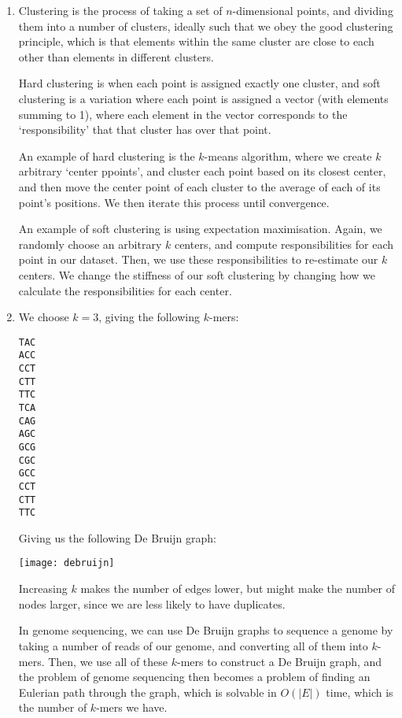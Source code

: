 \begin{enumerate}[label=(\alph*)]
  \item
    Clustering is the process of taking a set of $n$-dimensional points, and dividing them into a number of clusters, ideally such that we obey the good clustering principle, which is that elements within the same cluster are close to each other than elements in different clusters.

    Hard clustering is when each point is assigned exactly one cluster, and soft clustering is a variation where each point is assigned a vector (with elements summing to 1), where each element in the vector corresponds to the `responsibility' that that cluster has over that point.

    An example of hard clustering is the $k$-means algorithm, where we create $k$ arbitrary `center ppoints', and cluster each point based on its closest center, and then move the center point of each cluster to the average of each of its point's positions. We then iterate this process until convergence.

    An example of soft clustering is using expectation maximisation. Again, we randomly choose an arbitrary $k$ centers, and compute responsibilities for each point in our dataset. Then, we use these responsibilities to re-estimate our $k$ centers. We change the stiffness of our soft clustering by changing how we calculate the responsibilities for each center.

  \item
    We choose $k=3$, giving the following $k$-mers:

\begin{verbatim}
TAC
ACC
CCT
CTT
TTC
TCA
CAG
AGC
GCG
CGC
GCC
CCT
CTT
TTC
\end{verbatim}

Giving us the following De Bruijn graph:

\texttt{[image: debruijn]}

Increasing $k$ makes the number of edges lower, but might make the number of nodes larger, since we are less likely to have duplicates.

In genome sequencing, we can use De Bruijn graphs to sequence a genome by taking a number of reads of our genome, and converting all of them into $k$-mers. Then, we use all of these $k$-mers to construct a De Bruijn graph, and the problem of genome sequencing then becomes a problem of finding an Eulerian path through the graph, which is solvable in $O(|E|)$ time, which is the number of $k$-mers we have.


        
\end{enumerate}

